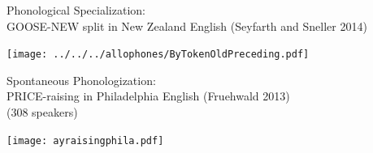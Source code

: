 \documentclass[hyperref={pdfpagelabels=false}]{beamer}
\begin{document}
\begin{frame}{Phonological Specialization: \\ \small{GOOSE-NEW split in New Zealand English (Seyfarth and Sneller 2014)}}

\begin{center}
\texttt{[image: ../../../allophones/ByTokenOldPreceding.pdf]}
\end{center}
\end{frame}


\begin{frame}{Spontaneous Phonologization: \\ \small{PRICE-raising in Philadelphia English (Fruehwald 2013)\\(308 speakers)}}

	
\texttt{[image: ayraisingphila.pdf]}

\end{frame}
\end{document}
